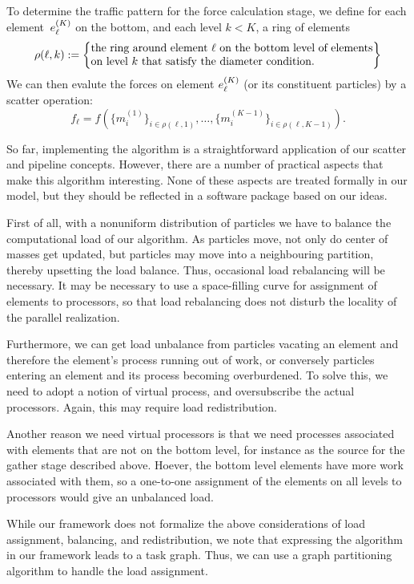 To determine the traffic pattern for the force calculation stage, we
define for each element~$e^{(K)}_\ell$ on the bottom, and each level
$k<K$, a ring of elements
\[ \rho(\ell,k) \mathrel{:=} \left\{\vcenter{\hsize=3.5in \noindent
   the ring around element $\ell$ on the bottom level of elements
   on level $k$ that satisfy the diameter condition.}\right\}
\]
We can then evalute the forces on element $e^{(K)}_\ell$ (or its
constituent particles) by a scatter operation:
\[ f_\ell = f( \{ m^{(1)}_i\}_{i\in\rho(\ell,1)},\ldots,
        \{ m^{(K-1)}_i\}_{i\in\rho(\ell,K-1)}).
\]

So far, implementing the algorithm is a straightforward application of
our scatter and pipeline concepts. However, there are a number of
practical aspects that make this algorithm interesting. None of these
aspects are treated formally in our model, but they should be
reflected in a software package based on our ideas.

First of all, with a nonuniform distribution of particles we have to
balance the computational load of our algorithm. 
As particles move, not only do center of masses get updated, but
particles may move into a neighbouring partition, thereby upsetting
the load balance. Thus, occasional load rebalancing will be
necessary. It may be necessary to use a space-filling curve for
assignment of elements to processors, so that load rebalancing does
not disturb the locality of the parallel realization.

Furthermore, we can get load unbalance from particles vacating an
element and therefore the element's process running out of work, or
conversely particles entering an element and its process becoming
overburdened. To solve this, we need to adopt a notion of virtual
process, and oversubscribe the actual processors. Again, this may
require load redistribution.

Another reason we need virtual processors is that we need processes
associated with elements that are not on the bottom level, for
instance as the source for the gather stage described above. Hoever,
the bottom level elements have more work associated with them, so a
one-to-one assignment of the elements on all levels to processors
would give an unbalanced load.

While our framework does not formalize the above considerations of
load assignment, balancing, and redistribution, we note that
expressing the algorithm in our framework leads to a task graph. Thus,
we can use a graph partitioning algorithm to handle the load
assignment.

